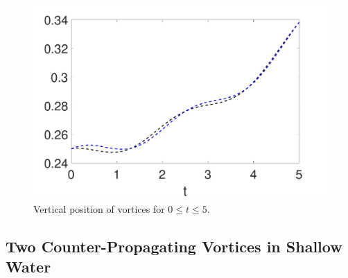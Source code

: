 \documentclass[a4paper,11pt]{article}
\begin{document}
\begin{figure}[!h]
\centering
\includegraphics[width=.75\textwidth]{ztrack_cnoid_mu_pt2_F_1_tf_5_gam_pt1}
\caption{Vertical position of vortices for $0\leq t \leq 5$.}
\label{fig:cnztrackpt1}
\end{figure}

\subsection*{Two Counter-Propagating Vortices in Shallow Water}
\end{document}
